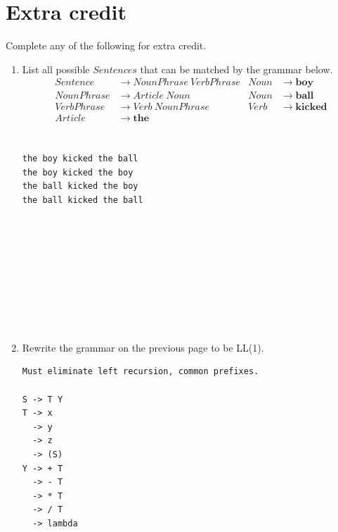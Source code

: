 \documentclass[10pt]{amsart}
\begin{document}
\section{Extra credit}
Complete any of the following for extra credit.

\begin{enumerate}
\item List all possible $Sentences$ that can be matched by the grammar below.
\begin{align*}
Sentence &\to NounPhrase\ VerbPhrase &     Noun &\to \mathbf{boy}\\
    NounPhrase &\to Article\ Noun    &   Noun &\to \mathbf{ball}\\
    VerbPhrase &\to Verb\ NounPhrase   &  Verb &\to \mathbf{kicked}\\
 Article &\to \mathbf{the}\\ 
\end{align*}
\begin{verbatim}

the boy kicked the ball
the boy kicked the boy
the ball kicked the boy
the ball kicked the ball










\end{verbatim}
\item Rewrite the grammar on the previous page to be LL(1).
\begin{verbatim}
Must eliminate left recursion, common prefixes.

S -> T Y
T -> x
  -> y
  -> z
  -> (S)
Y -> + T
  -> - T
  -> * T
  -> / T
  -> lambda
\end{verbatim}
\end{enumerate}
\end{document}
